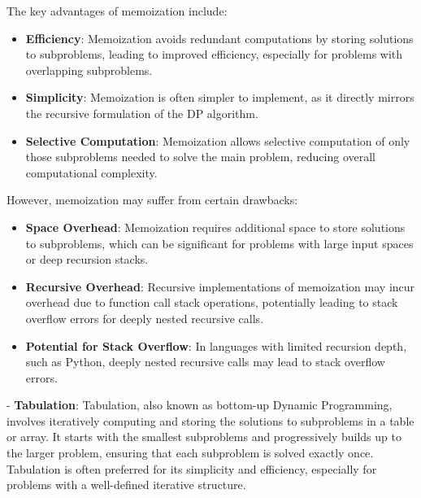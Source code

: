 \documentclass[12pt]{book} %
\begin{document}
The key advantages of memoization include:

\begin{itemize}
    \item \textbf{Efficiency}: Memoization avoids redundant computations by storing solutions to subproblems, leading to improved efficiency, especially for problems with overlapping subproblems.
    \item \textbf{Simplicity}: Memoization is often simpler to implement, as it directly mirrors the recursive formulation of the DP algorithm.
    \item \textbf{Selective Computation}: Memoization allows selective computation of only those subproblems needed to solve the main problem, reducing overall computational complexity.
\end{itemize}

However, memoization may suffer from certain drawbacks:

\begin{itemize}
    \item \textbf{Space Overhead}: Memoization requires additional space to store solutions to subproblems, which can be significant for problems with large input spaces or deep recursion stacks.
    \item \textbf{Recursive Overhead}: Recursive implementations of memoization may incur overhead due to function call stack operations, potentially leading to stack overflow errors for deeply nested recursive calls.
    \item \textbf{Potential for Stack Overflow}: In languages with limited recursion depth, such as Python, deeply nested recursive calls may lead to stack overflow errors.
\end{itemize}

- \textbf{Tabulation}: Tabulation, also known as bottom-up Dynamic Programming, involves iteratively computing and storing the solutions to subproblems in a table or array. It starts with the smallest subproblems and progressively builds up to the larger problem, ensuring that each subproblem is solved exactly once. Tabulation is often preferred for its simplicity and efficiency, especially for problems with a well-defined iterative structure.
\end{document}
